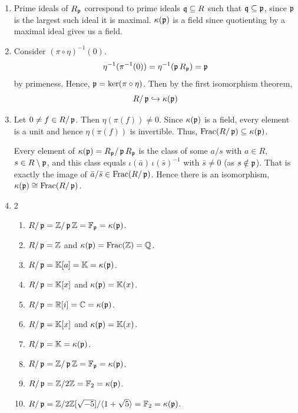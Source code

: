 \documentclass[Notebook.tex]{subfiles}
\begin{document}
\begin{solution}
    \bbni
    \begin{enumerate}
        \item Prime ideals of $R_{\fp}$ correspond to prime ideals $\fq \subseteq R$ such that $\fq \subseteq \fp$, since $\fp$ is the largest such ideal it is maximal. $\kappa(\fp)$ is a field since quotienting by a maximal ideal gives us a field. 
        
        \item Consider $(\pi \circ \eta)^{-1} (0)$. 
        \[ \eta^{-1}(\pi^{-1}(0)) = \eta^{-1}(\fp R_{\fp}) = \fp\]
        by primeness.
        Hence, $\fp = \ker(\pi \circ \eta)$. Then by the first isomorphism theorem, 
        \[R/\fp \hookrightarrow \kappa(\fp)\]

        \item Let $0 \neq f \in R/\fp$. Then $\eta(\pi(f)) \neq 0$. Since $\kappa(\fp)$ is a field, every element is a unit and hence $\eta(\pi(f))$ is invertible. 
        Thus, $\Frac(R/\fp) \subseteq \kappa(\fp)$. 
        
        Every element of $\kappa(\fp) = R_{\fp} / \fp R_{\fp}$ is the class of some
        $a/s$ with $a \in R$, $s \in R \setminus \fp$, and this class equals
        $\iota(\bar a)\,\iota(\bar s)^{-1}$ with $\bar s \neq 0$ (as $s \notin \fp$). That is exactly
        the image of $\bar a / \bar s \in \Frac(R/\fp)$. Hence there is an isomorphism,
        $\kappa(\fp) \cong \Frac(R/\fp)$.
        \item  \begin{multicols}{2}
        \begin{enumerate}
            \item $R/\fp = \Z/\fp\Z = \F_{\fp} = \kappa(\fp)$.
            \item $R/\fp=\Z$ and $\kappa(\fp) = \Frac(\Z) = \Q$.
            \item $R/\fp=\K[a] = \K = \kappa(\fp)$.
            \item $R/\fp=\K[x]$ and $\kappa(\fp) = \K(x)$. 
            \item $R/\fp=\R[i] = \C = \kappa(\fp)$.
            \item $R/\fp=\K[x]$ and $\kappa(\fp) = \K(x)$. 
            \item $R/\fp=\K = \kappa(\fp)$. 
            \item $R/\fp = \Z/\fp\Z = \F_{\fp} = \kappa(\fp)$.
            \item $R/\fp=\Z/2\Z = \F_2 = \kappa(\fp)$. 
            \item $R/\fp=\Z/2\Z[\sqrt{-5}]/\langle 1 + \sqrt{5} \rangle = \F_2 = \kappa(\fp)$.
        \end{enumerate}
        \end{multicols}
    \end{enumerate}
\end{solution}
\end{document}
